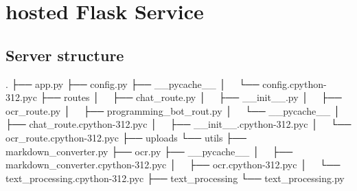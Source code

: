 \chapter{hosted Flask Service}
\label{cha:hosted_flask_service}


\section{Server structure}

.
├── app.py
├── config.py
├── __pycache__
│   └── config.cpython-312.pyc
├── routes
│   ├── chat_route.py
│   ├── __init__.py
│   ├── ocr_route.py
│   ├── programming_bot_rout.py
│   └── __pycache__
│       ├── chat_route.cpython-312.pyc
│       ├── __init__.cpython-312.pyc
│       └── ocr_route.cpython-312.pyc
├── uploads
└── utils
    ├── markdown_converter.py
    ├── ocr.py
    ├── __pycache__
    │   ├── markdown_converter.cpython-312.pyc
    │   ├── ocr.cpython-312.pyc
    │   └── text_processing.cpython-312.pyc
    ├── text_processing
    └── text_processing.py

    


